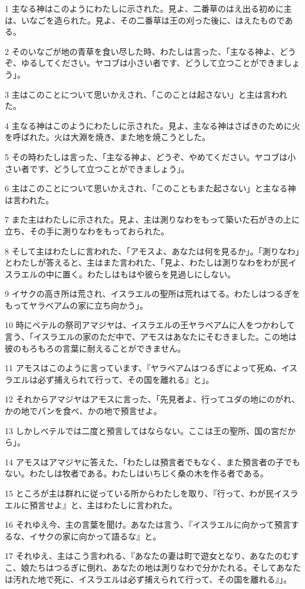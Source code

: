 \par 1 主なる神はこのようにわたしに示された。見よ、二番草のはえ出る初めに主は、いなごを造られた。見よ、その二番草は王の刈った後に、はえたものである。
\par 2 そのいなごが地の青草を食い尽した時、わたしは言った、「主なる神よ、どうぞ、ゆるしてください。ヤコブは小さい者です、どうして立つことができましょう」。
\par 3 主はこのことについて思いかえされ、「このことは起さない」と主は言われた。
\par 4 主なる神はこのようにわたしに示された。見よ、主なる神はさばきのために火を呼ばれた。火は大淵を焼き、また地を焼こうとした。
\par 5 その時わたしは言った、「主なる神よ、どうぞ、やめてください。ヤコブは小さい者です、どうして立つことができましょう」。
\par 6 主はこのことについて思いかえされ、「このこともまた起さない」と主なる神は言われた。
\par 7 また主はわたしに示された。見よ、主は測りなわをもって築いた石がきの上に立ち、その手に測りなわをもっておられた。
\par 8 そして主はわたしに言われた、「アモスよ、あなたは何を見るか」。「測りなわ」とわたしが答えると、主はまた言われた、「見よ、わたしは測りなわをわが民イスラエルの中に置く。わたしはもはや彼らを見過しにしない。
\par 9 イサクの高き所は荒され、イスラエルの聖所は荒れはてる。わたしはつるぎをもってヤラベアムの家に立ち向かう」。
\par 10 時にベテルの祭司アマジヤは、イスラエルの王ヤラベアムに人をつかわして言う、「イスラエルの家のただ中で、アモスはあなたにそむきました。この地は彼のもろもろの言葉に耐えることができません。
\par 11 アモスはこのように言っています、『ヤラベアムはつるぎによって死ぬ、イスラエルは必ず捕えられて行って、その国を離れる』と」。
\par 12 それからアマジヤはアモスに言った、「先見者よ、行ってユダの地にのがれ、かの地でパンを食べ、かの地で預言せよ。
\par 13 しかしベテルでは二度と預言してはならない。ここは王の聖所、国の宮だから」。
\par 14 アモスはアマジヤに答えた、「わたしは預言者でもなく、また預言者の子でもない。わたしは牧者である。わたしはいちじく桑の木を作る者である。
\par 15 ところが主は群れに従っている所からわたしを取り、『行って、わが民イスラエルに預言せよ』と、主はわたしに言われた。
\par 16 それゆえ今、主の言葉を聞け。あなたは言う、『イスラエルに向かって預言するな、イサクの家に向かって語るな』と。
\par 17 それゆえ、主はこう言われる、『あなたの妻は町で遊女となり、あなたのむすこ、娘たちはつるぎに倒れ、あなたの地は測りなわで分かたれる。そしてあなたは汚れた地で死に、イスラエルは必ず捕えられて行って、その国を離れる』」。

